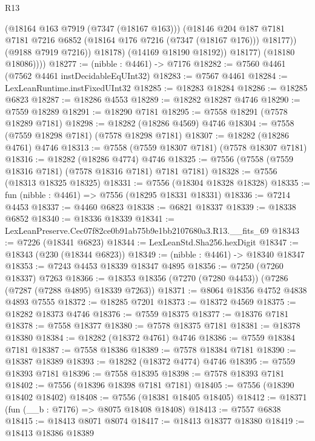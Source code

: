 \begin{lexlean}{R13}
\begin{coremodule}
                    (@18164 @163 @7919 (@7347 (@18167 @163)))
                    (@18146
                      @204
                      @187
                      @7181
                      @7181
                      @7216
                      @6852
                      (@18164 @176 @7216 (@7347 (@18167 @176)))
                      @18177))
                  (@9188 @7919 @7216))
                @18178)
              (@14169 @18190 @18192))
            @18177)
          (@18180 @18086))))
@18277 := (nibble : @4461) -> @7176
@18282 := @7560 @4461 (@7562 @4461 instDecidableEqUInt32)
@18283 := @7567 @4461
@18284 := LexLeanRuntime.instFixedUInt32
@18285 := @18283 @18284
@18286 := @18285 @6823
@18287 := @18286 @4553
@18289 := @18282 @18287 @4746
@18290 := @7559 @18289
@18291 := @18290 @7181
@18295 := @7558 @18291 (@7578 @18289 @7181)
@18298 := @18282 (@18286 @4569) @4746
@18304 := @7558 (@7559 @18298 @7181) (@7578 @18298 @7181)
@18307 := @18282 (@18286 @4761) @4746
@18313 := @7558 (@7559 @18307 @7181) (@7578 @18307 @7181)
@18316 := @18282 (@18286 @4774) @4746
@18325 := @7556 (@7558 (@7559 @18316 @7181) (@7578 @18316 @7181) @7181 @7181)
@18328 := @7556 (@18313 @18325 @18325)
@18331 := @7556 (@18304 @18328 @18328)
@18335 := fun (nibble : @4461) => @7556 (@18295 @18331 @18331)
@18336 := @7214 @4453
@18337 := @4460 @6823
@18338 := @6821 @18337
@18339 := @18338 @6852
@18340 := @18336 @18339
@18341 := LexLeanPreserve.Cec07f82ce0b91ab75b9e1bb2107680a3.R13.__fits_69
@18343 := @7226 (@18341 @6823)
@18344 := LexLeanStd.Sha256.hexDigit
@18347 := @18343 (@230 (@18344 @6823))
@18349 := (nibble : @4461) -> @18340 @18347
@18353 := @7243 @4453 @18339 @18347 @4895
@18356 := @7250 (@7260 @18337) @7263
@18366 := @18353 @18356 (@7270 (@7280 @4453)) (@7286 (@7287 (@7288 @4895) @18339 @7263))
@18371 := @8064 @18356 @4752 @4838 @4893 @7555
@18372 := @18285 @7201
@18373 := @18372 @4569
@18375 := @18282 @18373 @4746
@18376 := @7559 @18375
@18377 := @18376 @7181
@18378 := @7558 @18377
@18380 := @7578 @18375 @7181
@18381 := @18378 @18380
@18384 := @18282 (@18372 @4761) @4746
@18386 := @7559 @18384 @7181
@18387 := @7558 @18386
@18389 := @7578 @18384 @7181
@18390 := @18387 @18389
@18393 := @18282 (@18372 @4774) @4746
@18395 := @7559 @18393 @7181
@18396 := @7558 @18395
@18398 := @7578 @18393 @7181
@18402 := @7556 (@18396 @18398 @7181 @7181)
@18405 := @7556 (@18390 @18402 @18402)
@18408 := @7556 (@18381 @18405 @18405)
@18412 := @18371 (fun (__b : @7176) => @8075 @18408 @18408)
@18413 := @7557 @6838
@18415 := @18413 @8071 @8074
@18417 := @18413 @18377 @18380
@18419 := @18413 @18386 @18389

\end{coremodule}
\end{lexlean}
